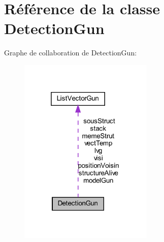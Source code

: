\hypertarget{class_detection_gun}{}\section{Référence de la classe Detection\+Gun}
\label{class_detection_gun}


Graphe de collaboration de Detection\+Gun\+:
\nopagebreak
\begin{figure}[H]
\begin{center}
\leavevmode
\includegraphics[width=181pt]{class_detection_gun__coll__graph}
\end{center}
\end{figure}

